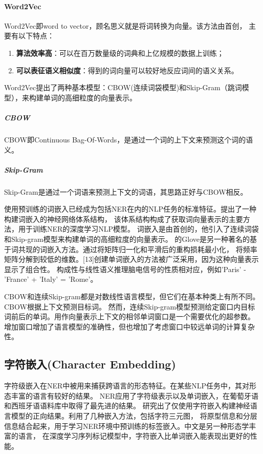 \paragraph{Word2Vec}

Word2Vec即word to vector，顾名思义就是将词转换为向量。该方法由\parencite{mikolov2013efficient}首创，
主要有以下特点：
\begin{enumerate}
    \item \textbf{算法效率高}：可以在百万数量级的词典和上亿规模的数据上训练；
    \item \textbf{可以表征语义相似度}：得到的词向量可以较好地反应词间的语义关系。
\end{enumerate}

Word2Vec提出了两种基本模型：CBOW(连续词袋模型)和Skip-Gram（跳词模型），来构建单词的高细粒度的向量表示。

\subparagraph{CBOW}
CBOW即Continuous Bag-Of-Words，是通过一个词的上下文来预测这个词的语义。


\subparagraph{Skip-Gram}
Skip-Gram是通过一个词语来预测上下文的词语，其思路正好与CBOW相反。


使用预训练的词嵌入已经成为包括NER在内的NLP任务的标准特征。\parencite{collobert2011natural}提出了一种构建词嵌入的神经网络体系结构，
该体系结构构成了获取词向量表示的主要方法，用于训练NER的深度学习NLP模型。
词嵌入是由\parencite{mikolov2013efficient}首创的，他引入了连续词袋和Skip-gram模型来构建单词的高细粒度的向量表示。
\parencite{pennington2014glove}的Glove是另一种著名的基于词共现的词嵌入方法。通过将矩阵归一化和平滑后的重构损耗最小化，
将频率矩阵分解到较低的维数。[13]创建单词嵌入的方法被广泛采用，因为这种向量表示显示了组合性。
构成性与线性语义推理脑电信号的性质相对应，例如'Paris' - 'France' + 'Italy' = 'Rome'。

CBOW和连续Skip-gram都是对数线性语言模型，但它们在基本种类上有所不同。CBOW根据上下文预测目标词。
然而，连续Skip-gram模型预测给定窗口内目标词前后的单词。用作向量表示上下文的相邻单词窗口是一个需要优化的超参数。
增加窗口增加了语言模型的准确性，但也增加了考虑窗口中较远单词的计算复杂性。

\subsection{字符嵌入(Character Embedding)}

字符级嵌入在NER中被用来捕获跨语言的形态特征。在某些NLP任务中，其对形态丰富的语言有较好的结果。
\parencite{santos2015boosting}NER应用了字符级表示以及单词嵌入，在葡萄牙语和西班牙语语料库中取得了最先进的结果。
\parencite{kim2016character}研究出了仅使用字符嵌入构建神经语言模型的正向结果。\parencite{ma2016end}利用了几种嵌入方法，包括字符三元图，
将原型信息和分层信息结合起来，用于学习NER环境中预训练的标签嵌入。中文是另一种形态学丰富的语言，
在深度学习序列标记模型中，字符嵌入比单词嵌入能表现出更好的性能\parencite{zheng2013deep}。

